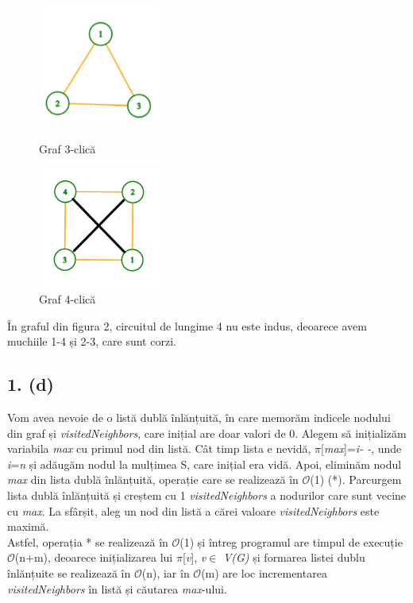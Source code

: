 \documentclass[12pt] {fphw}
\begin{document}
\begin{figure}[h] 
\begin{minipage}[c]{ .3\linewidth}
\includegraphics [height=4cm]{graph1.png}
\caption{Graf 3-clică}
\end{minipage}\hfill
\begin{minipage}[c]{.3\linewidth}
\includegraphics [height=4cm]{graph2.png}
\caption{Graf 4-clică }
\end{minipage}
\end{figure}

În graful din figura 2, circuitul de lungime 4 nu este indus, deoarece avem muchiile 1-4 și 2-3, care sunt corzi. 

\subsection*{1. (d)}
 Vom avea nevoie de o listă dublă înlănțuită, în care memorăm indicele nodului din graf și \textit{visitedNeighbors}, care inițial are doar valori de 0. Alegem să inițializăm variabila \textit{max} cu primul nod din listă. Cât timp lista e nevidă,  $\pi$[\textit{max}]=\textit{i- -}, unde \textit{i}=\textit{n} și adăugăm nodul la mulțimea S, care inițial era vidă. Apoi, eliminăm nodul \textit{max} din lista dublă înlănțuită, operație care se realizează în $\mathcal{O}$(1) (*). Parcurgem lista dublă înlănțuită și creștem cu 1 \textit{visitedNeighbors} a nodurilor care sunt vecine cu \textit{max}. La sfârșit, aleg un nod din listă a cărei valoare \textit{visitedNeighbors} este maximă. \\Astfel, operația * se realizează în $\mathcal{O}$(1) și întreg programul are timpul de execuție $\mathcal{O}$(n+m), deoarece inițializarea lui $\pi$[\textit{v}], \textit{v}$\in$ \textit{V(G)} și formarea listei dublu înlănțuite se realizează în $\mathcal{O}$(n), iar în $\mathcal{O}$(m)
are loc incrementarea \textit{visitedNeighbors} în listă și căutarea \textit{max}-ului.
\end{document}
